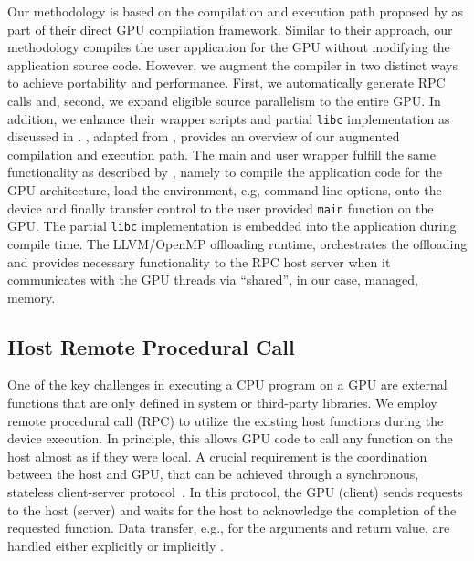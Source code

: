 Our methodology is based on the compilation and execution path proposed by \citet{DBLP:conf/llvmhpc/TianHPCD22} as part of their direct GPU compilation framework.
Similar to their approach, our methodology compiles the user application for the GPU without modifying the application source code.
However, we augment the compiler in two distinct ways to achieve portability and performance.
First, we automatically generate RPC calls and, second, we expand eligible source parallelism to the entire GPU.
In addition, we enhance their wrapper scripts and partial \texttt{libc} implementation as discussed in .
, adapted from \citet{DBLP:conf/llvmhpc/TianHPCD22}, provides an overview of our augmented compilation and execution path.
The main and user wrapper fulfill the same functionality as described by \citet{DBLP:conf/llvmhpc/TianHPCD22}, namely to compile the application code for the GPU architecture, load the environment, e.g, command line options, onto the device and finally transfer control to the user provided \lstinline|main| function on the GPU.
The partial \texttt{libc} implementation is embedded into the application during compile time.
The LLVM/OpenMP offloading runtime, orchestrates the offloading and provides necessary functionality to the RPC host server when it communicates with the GPU threads via ``shared'', in our case, managed, memory.


\subsection{Host Remote Procedural Call}
One of the key challenges in executing a CPU program on a GPU are external functions that are only defined in system or third-party libraries.
We employ remote procedural call (RPC) to utilize the existing host functions during the device execution.
In principle, this allows GPU code to call any function on the host almost as if they were local.
A crucial requirement is the coordination between the host and GPU, that can be achieved through a synchronous, stateless client-server protocol~\cite{DBLP:conf/asplos/SilbersteinFKW13,DBLP:conf/ipps/MikushinLZB14,DBLP:conf/llvmhpc/TianHPCD22}.
In this protocol, the GPU (client) sends requests to the host (server) and waits for the host to acknowledge the completion of the requested function.
Data transfer, e.g., for the arguments and return value, are handled either explicitly \cite{DBLP:conf/llvmhpc/TianHPCD22} or implicitly \cite{DBLP:conf/ipps/MikushinLZB14}.
